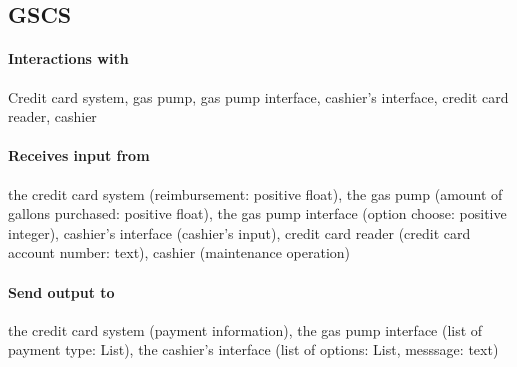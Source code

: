 \subsection{GSCS}

\paragraph{Interactions with} Credit card system, gas pump, gas pump
interface, cashier's interface, credit card reader, cashier

\paragraph{Receives input from} the credit card system (reimbursement:
positive float), the gas pump (amount of gallons purchased: positive
float), the gas pump interface (option choose: positive integer),
cashier's interface (cashier's input), credit card reader (credit card
account number: text), cashier (maintenance operation)

\paragraph{Send output to} the credit card system (payment information),
the gas pump interface (list of payment type: List), the cashier's interface (list of options: List, messsage: text)
